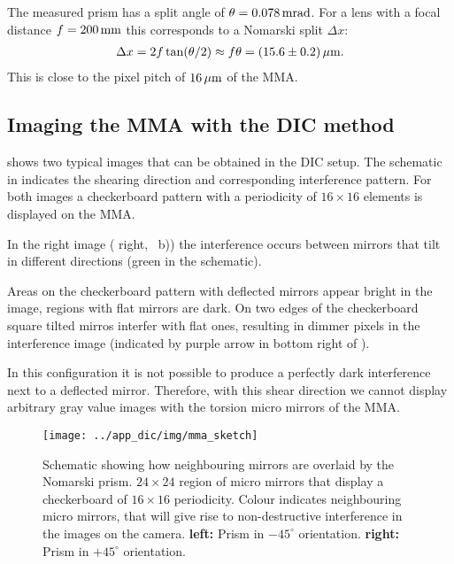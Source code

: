 The measured prism has a split angle of $\theta=\unit[0.078]{mrad}$.  For
a lens with a focal distance $f=\unit[200]{mm}$ this corresponds to a
Nomarski split $\Delta x$:
\begin{align}
  \Delta x=2f\tan(\theta/2)\approx f\theta=\unit[(15.6\pm0.2)]{\mu m}.
\end{align}
This is close to the pixel pitch of $\unit[16]{\mu m}$ of the MMA.

\subsection{Imaging the MMA with the DIC method}
 shows two typical images that can be obtained in
the DIC setup. The schematic in  indicates the
shearing direction and corresponding interference pattern.  For both
images a checkerboard pattern with a periodicity of $16\times16$
elements is displayed on the MMA.

In the right image ( right,
~b)) the interference occurs between mirrors that
tilt in different directions (green in the schematic).

Areas on the checkerboard pattern with deflected mirrors appear bright
in the image, regions with flat mirrors are dark. On two edges of the
checkerboard square tilted mirros interfer with flat ones, resulting
in dimmer pixels in the interference image (indicated by purple arrow
in bottom right of ).

In this configuration it is not possible to produce a perfectly dark
interference next to a deflected mirror.  Therefore, with this shear
direction we cannot display arbitrary gray value images with the
torsion micro mirrors of the MMA.


\begin{figure}[ht]
  \centering
  \texttt{[image: ../app\_dic/img/mma\_sketch]}
  \caption{Schematic showing how neighbouring mirrors are overlaid by
    the Nomarski prism. $24\times 24$ region of micro mirrors that
    display a checkerboard of $16\times 16$ periodicity. Colour
    indicates neighbouring micro mirrors, that will give rise to
    non-destructive interference in the images on the camera. {\bf
      left:} Prism in $-45^\circ$ orientation. {\bf right:} Prism in
    $+45^\circ$ orientation.}
  \label{fig:screen}
\end{figure}

